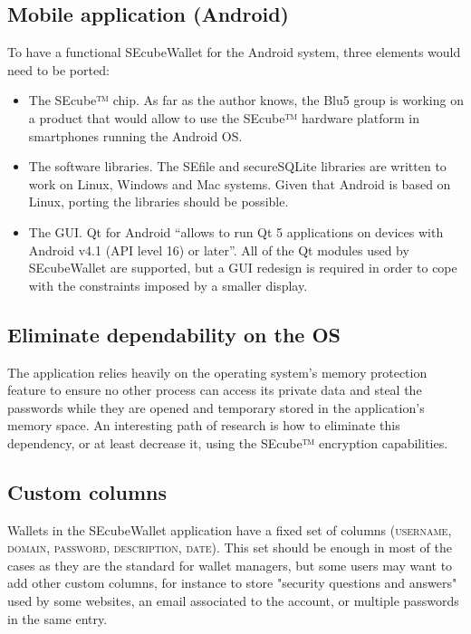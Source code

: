 \subsection{Mobile application (Android)}
To have a functional SEcubeWallet for the Android system, three elements would need to be ported:
\begin{itemize}
\item The SEcube™ chip. As far as the author knows, the Blu5 group is working on a product that would allow to use the SEcube™ hardware platform in smartphones running the Android OS.
\item The software libraries. The SEfile and secureSQLite libraries are written to work on Linux, Windows and Mac systems. Given that Android is based on Linux, porting the libraries should be possible.
\item The GUI. Qt for Android \cite{android} ``allows to run Qt 5 applications on devices with Android v4.1 (API level 16) or later''. All of the Qt modules used by SEcubeWallet are supported, but a GUI redesign is required in order to cope with the constraints imposed by a smaller display.
\end{itemize}

\subsection{Eliminate dependability on the OS}

The application relies heavily on the operating system's memory protection feature to ensure no other process can access its private data and steal the passwords while they are opened and temporary stored in the application's memory space. An interesting path of research is how to eliminate this dependency, or at least decrease it, using the SEcube™ encryption capabilities.

\subsection{Custom columns}

Wallets in the SEcubeWallet application have a fixed set of columns (\textsc{username}, \textsc{domain}, \textsc{password}, \textsc{description}, \textsc{date}). This set should be enough in most of the cases as they are the standard for wallet managers, but some users may want to add other custom columns, for instance to store "security questions and answers" used by some websites, an email associated to the account, or multiple passwords in the same entry.

